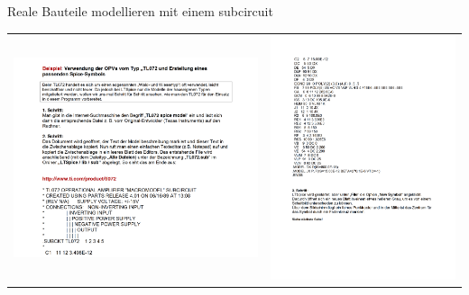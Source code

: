 \begin{frame}[t]{Reale Bauteile modellieren mit einem subcircuit}
\begin{spacing}{0.9}
\begin{tiny}
\begin{table}[h!]
\begin{tabular}{p{5cm} p{5cm}}
\begin{minipage}{0.5\textwidth}
                \includegraphics[width=\linewidth]{pictures/legacy/tl072_1.png}
            \end{minipage} 
            &
            \begin{minipage}{0.5\textwidth}
                \includegraphics[width=\linewidth]{pictures/legacy/tl072_2.png}

\end{minipage}
\end{tabular}
\end{table}
\end{tiny}
\end{spacing}
\end{frame}
